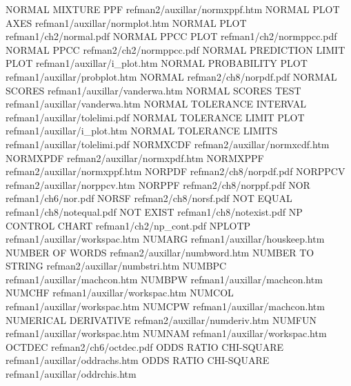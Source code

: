 NORMAL MIXTURE PPF                      refman2/auxillar/normxppf.htm
NORMAL PLOT AXES                        refman1/auxillar/normplot.htm
NORMAL PLOT                             refman1/ch2/normal.pdf
NORMAL PPCC PLOT                        refman1/ch2/normppcc.pdf
NORMAL PPCC                             refman2/ch2/normppcc.pdf
NORMAL PREDICTION LIMIT PLOT            refman1/auxillar/i_plot.htm
NORMAL PROBABILITY PLOT                 refman1/auxillar/probplot.htm
NORMAL                                  refman2/ch8/norpdf.pdf
NORMAL SCORES                           refman1/auxillar/vanderwa.htm
NORMAL SCORES TEST                      refman1/auxillar/vanderwa.htm
NORMAL TOLERANCE INTERVAL               refman1/auxillar/tolelimi.pdf
NORMAL TOLERANCE LIMIT PLOT             refman1/auxillar/i_plot.htm
NORMAL TOLERANCE LIMITS                 refman1/auxillar/tolelimi.pdf
NORMXCDF                                refman2/auxillar/normxcdf.htm
NORMXPDF                                refman2/auxillar/normxpdf.htm
NORMXPPF                                refman2/auxillar/normxppf.htm
NORPDF                                  refman2/ch8/norpdf.pdf
NORPPCV                                 refman2/auxillar/norppcv.htm
NORPPF                                  refman2/ch8/norppf.pdf
NOR                                     refman1/ch6/nor.pdf
NORSF                                   refman2/ch8/norsf.pdf
NOT EQUAL                               refman1/ch8/notequal.pdf
NOT EXIST                               refman1/ch8/notexist.pdf
NP CONTROL CHART                        refman1/ch2/np_cont.pdf
NPLOTP                                  refman1/auxillar/workspac.htm
NUMARG                                  refman1/auxillar/houskeep.htm
NUMBER OF WORDS                         refman2/auxillar/numbword.htm
NUMBER TO STRING                        refman2/auxillar/numbstri.htm
NUMBPC                                  refman1/auxillar/machcon.htm
NUMBPW                                  refman1/auxillar/machcon.htm
NUMCHF                                  refman1/auxillar/workspac.htm
NUMCOL                                  refman1/auxillar/workspac.htm
NUMCPW                                  refman1/auxillar/machcon.htm
NUMERICAL DERIVATIVE                    refman2/auxillar/numderiv.htm
NUMFUN                                  refman1/auxillar/workspac.htm
NUMNAM                                  refman1/auxillar/workspac.htm
OCTDEC                                  refman2/ch6/octdec.pdf
ODDS RATIO CHI-SQUARE                   refman1/auxillar/oddrachs.htm
ODDS RATIO CHI-SQUARE                   refman1/auxillar/oddrchis.htm
